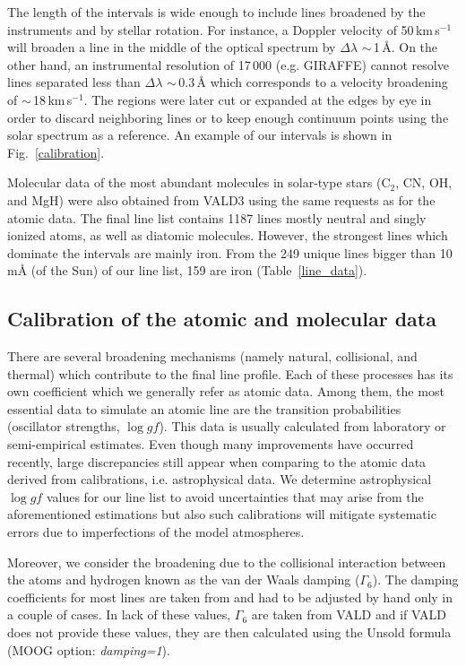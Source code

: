 \documentclass[fleqn,usenatbib]{mnras}
\begin{document}
The length of the intervals is wide enough to include lines broadened by the instruments and by stellar rotation. For instance, a Doppler velocity of 50\,km\,s$^{-1}$ will broaden 
a line in the middle of the optical spectrum by $\Delta\lambda$ $\sim$\,1\,\AA{}. On the other hand, an instrumental resolution of 17\,000 (e.g. GIRAFFE) cannot resolve lines separated less than 
$\Delta\lambda$ $\sim$\,0.3\,\AA{} which corresponds to a velocity broadening of $\sim$\,18\,km\,s$^{-1}$. 
The regions were later cut or expanded at the edges by eye in order to discard neighboring lines or to keep enough continuum points using the solar spectrum as a reference. 
An example of our intervals is shown in Fig.~\ref{calibration}.

Molecular data of the most abundant molecules in solar-type stars (C$_{2}$, CN, OH, and MgH) were also obtained from VALD3 using the same requests as for 
the atomic data. The final line list contains 1187 lines mostly neutral and singly ionized atoms, as well as diatomic molecules. 
However, the strongest lines which dominate the intervals are mainly iron. From the 249 unique lines bigger than 10\,m\AA{} (of the Sun) of our line list, 159 are iron (Table~\ref{line_data}).

\subsection{Calibration of the atomic and molecular data}

There are several broadening mechanisms (namely natural, collisional, and thermal) which contribute to the final line profile. Each of these processes has its own coefficient which we generally 
refer as atomic data. Among them, the most essential data to simulate an atomic line are the transition probabilities (oscillator strengths, $\log gf$). 
This data is usually calculated from laboratory or semi-empirical estimates. Even though many improvements have occurred recently, large discrepancies still appear when comparing to the atomic data 
derived from calibrations, i.e. astrophysical data. We determine astrophysical $\log gf$ values for our line list to avoid uncertainties that may arise from the aforementioned estimations 
but also such calibrations will mitigate systematic errors due to imperfections of the model atmospheres.

Moreover, we consider the broadening due to the collisional interaction between the atoms and hydrogen known as the van der Waals damping ($\Gamma_{6}$). 
The damping coefficients for most lines are taken from \cite{barklem2000} and had to be adjusted by hand only in a couple of cases. In lack of these values, $\Gamma_{6}$ are taken 
from VALD and if VALD does not provide these values, they are then calculated using the Unsold formula \citep{unsold1955} (MOOG option: \textit{damping=1}).    
\end{document}
